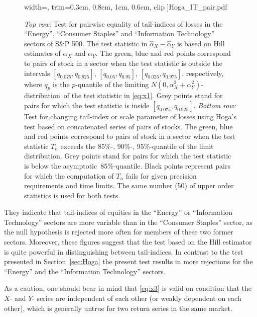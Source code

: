 \documentclass[11pt,a4]{amsart}
\newcommand{\asy}{asymptotic}
\newcommand{\ds}{distribution}
\newcommand{\1}{{\mathbf 1}}
\begin{document}
\begin{figure}[htb!]
\begin{minipage}{0.33\linewidth}
      width=\textwidth,
      trim={0.3cm, 0.8cm, 1cm, 0.6cm}, clip
    ]{Hoga_IT_pair.pdf}
  \end{minipage}
  \caption{{\em Top row}: Test for pairwise equality of tail-indices
    of losses in the  ``Energy'', ``Consumer Staples'' and
    ``Information Technology'' 
    sectors of S\&P 500. The test statistic in $\hat\alpha_X-\hat \alpha_Y$ is based
    on Hill estimates 
    of $\alpha_X$ and $\alpha_Y$. 
    The green, blue and red points correspond to pairs of stock in a sector
    when the test statistic is outside the intervals $[q_{0.075},q_{0.925}]$,
    $[q_{0.05},q_{0.95}]$,  $[q_{0.025},q_{0.975}]$, respectively, where
    $q_p$ is the $p$-quantile of the limiting 
    $N(0,\alpha_X^2+\alpha_Y^2)$-\ds\ of the test statistic in
    \eqref{eq:x1}. Grey points stand for pairs for which the test
    statistic is inside $[q_{0.075},q_{0.925}]$. 
    {\em Bottom row:} Test for changing tail-index or scale parameter
    of losses
    using Hoga's test based on concatenated series of pairs of
    stocks. The green, blue and red points
    correspond to pairs of stock in a sector 
    when the test statistic $T_n$ exceeds the $85\%$-, $90\%$-,
    $95\%$-quantile of the limit \ds .
  Grey points stand for pairs for which the test statistic is below
  the \asy\ $85\%$-quantile. Black points represent 
    pairs for which the computation of $T_n$ fails for given precision  
    requirements and time limits.
    The same number (50) of upper order statistics is used for both tests.}
  \label{fig:PairTest} 
\end{figure}
They indicate that tail-indices of equities in the
``Energy'' or ``Information Technology'' sectors are more variable 
than in the ``Consumer Staples'' sector, as the null
hypothesis is rejected more often for members of these two former sectors.
Moreover, these figures suggest that the test based on the Hill estimator
is quite powerful in distinguishing between tail-indices. In contrast to the test presented in Section~\ref{sec:Hoga}
the present test results in  more rejections for the ``Energy'' and the
``Information Technology'' sectors.
\par
As a caution, one should bear in mind that 
\eqref{eq:x3} is valid on condition that the $X$- and $Y$-
series are independent of each other (or weakly dependent on each other), which is generally untrue for
two return series in the same market.
\end{document}
